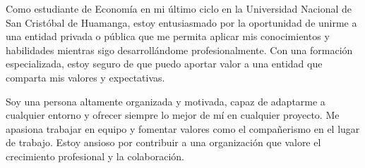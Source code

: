\par{
    Como estudiante de Economía en mi último ciclo en la Universidad Nacional de San Cristóbal de Huamanga, estoy entusiasmado por la oportunidad de unirme a una entidad privada o pública que me permita aplicar mis conocimientos y habilidades mientras sigo desarrollándome profesionalmente. Con una formación especializada, estoy seguro de que puedo aportar valor a una entidad que comparta mis valores y expectativas.

    Soy una persona altamente organizada y motivada, capaz de adaptarme a cualquier entorno y ofrecer siempre lo mejor de mí en cualquier proyecto. Me apasiona trabajar en equipo y fomentar valores como el compañerismo en el lugar de trabajo. Estoy ansioso por contribuir a una organización que valore el crecimiento profesional y la colaboración.










}